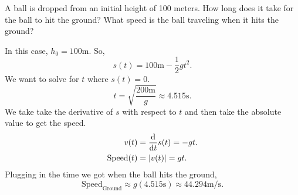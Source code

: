 \begin{example}
	A ball is dropped from an initial height of 100 meters.
	How long does it take for the ball to hit the ground?
	What speed is the ball traveling when it hits the ground?
\end{example}
In this case, $h_0 = 100\text{m}$.
So,
\begin{equation*}
	s(t) = 100\text{m} - \frac{1}{2}gt^2.
\end{equation*}
\indent
We want to solve for $t$ where $s(t)=0$.
\begin{equation*}
	t = \sqrt{\frac{200\text{m}}{g}} \approx 4.515\text{s}.
\end{equation*}
\indent
We take take the derivative of $s$ with respect to $t$ and then take the absolute value to get the speed.
\begin{align*}
	v(t) &= \frac{\mathrm{d} }{\mathrm{d} t}s(t) = -gt. \\
	\text{Speed}(t) &= \lvert v(t) \rvert = gt.
\end{align*}
\indent
Plugging in the time we got when the ball hits the ground,
\begin{equation*}
	\text{Speed}_{\text{Ground}} \approx g(4.515\text{s}) \approx 44.294\text{m/s}.
\end{equation*}